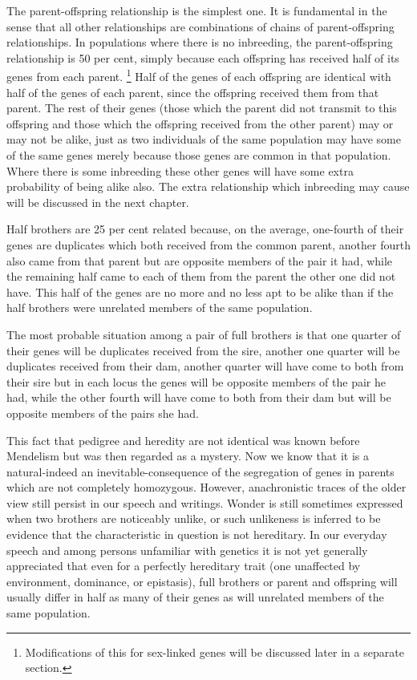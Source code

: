 The parent-offspring relationship is the simplest one. It is fundamental
in the sense that all other relationships are combinations of
chains of parent-offspring relationships. In populations where there is
no inbreeding, the parent-offspring relationship is 50 per cent, simply
because each offspring has received half of its genes from each parent.
\footnote{Modifications of this for sex-linked genes will be discussed
later in a separate section.} Half of the genes of each offspring are
identical with half of the genes of each parent, since the offspring
received them from that parent. The rest of their genes (those which the
parent did not transmit to this offspring and those which the offspring
received from the other parent) may or may not be alike, just as two
individuals of the same population may have some of the same genes merely
because those genes are common in that population. Where there is some
inbreeding these other genes will have some extra probability of being
alike also. The extra relationship which inbreeding may cause will be
discussed in the next chapter.
\noclub[2]

Half brothers are 25 per cent related because, on the average, one-fourth
of their genes are duplicates which both received from the common
parent, another fourth also came from that parent but are
opposite members of the pair it had, while the remaining half came to
each of them from the parent the other one did not have. This half of
the genes are no more and no less apt to be alike than if the half brothers
were unrelated members of the same population.

The most probable situation among a pair of full brothers is that
one quarter of their genes will be duplicates received from the sire,
another one quarter will be duplicates received from their dam, another
quarter will have come to both from their sire but in each locus the
genes will be opposite members of the pair he had, while the other
fourth will have come to both from their dam but will be opposite
members of the pairs she had.

This fact that pedigree and heredity are not identical was known
before Mendelism but was then regarded as a mystery. Now we know
that it is a natural-indeed an inevitable-consequence of the segregation
of genes in parents which are not completely homozygous. However,
anachronistic traces of the older view still persist in our speech
and writings. Wonder is still sometimes expressed when two brothers
are noticeably unlike, or such unlikeness is inferred to be evidence that
the characteristic in question is not hereditary. In our everyday speech
and among persons unfamiliar with genetics it is not yet generally
appreciated that even for a perfectly hereditary trait (one unaffected by
environment, dominance, or epistasis), full brothers or parent and offspring
will usually differ in half as many of their genes as will unrelated
members of the same population.

